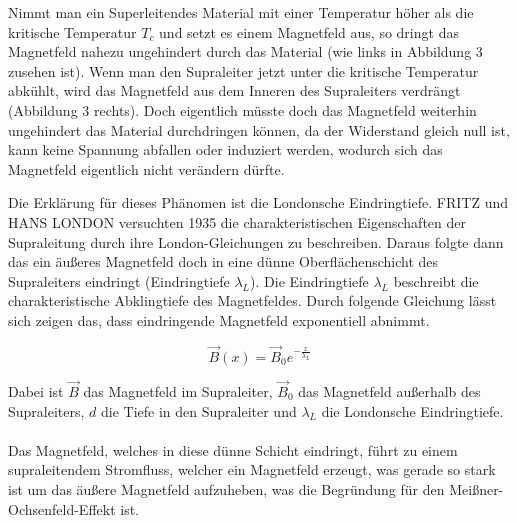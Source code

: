 Nimmt man ein Superleitendes Material mit einer Temperatur höher als die kritische Temperatur $T_c$
und setzt es einem Magnetfeld aus, so dringt das Magnetfeld nahezu ungehindert durch das Material (wie links in Abbildung 3 zusehen ist). 
Wenn man den Supraleiter jetzt unter die kritische Temperatur abkühlt, wird das Magnetfeld aus dem Inneren des Supraleiters verdrängt (Abbildung 3 rechts).
Doch eigentlich müsste doch das Magnetfeld weiterhin ungehindert das Material durchdringen können, da der 
Widerstand gleich null ist, kann keine Spannung abfallen oder induziert werden, wodurch sich das Magnetfeld 
eigentlich nicht verändern dürfte.

Die Erklärung für dieses Phänomen ist die Londonsche Eindringtiefe. FRITZ und HANS LONDON
versuchten 1935 die charakteristischen Eigenschaften der Supraleitung durch ihre London-Gleichungen 
zu beschreiben. Daraus folgte dann das ein äußeres Magnetfeld doch in eine dünne Oberflächenschicht des Supraleiters eindringt (Eindringtiefe $\lambda_L$).
Die Eindringtiefe $\lambda_L$ beschreibt die charakteristische Abklingtiefe des Magnetfeldes.
Durch folgende Gleichung lässt sich zeigen das, dass eindringende Magnetfeld exponentiell abnimmt.

\begin{equation}
    \vec{B}(x) = \vec{B}_0 e^{-\frac{x}{\lambda_L}}
\end{equation}

Dabei ist $\vec{B}$ das Magnetfeld im Supraleiter, $\vec{B}_0$ das Magnetfeld außerhalb des Supraleiters, $d$ die Tiefe in den Supraleiter und $\lambda_L$ die Londonsche Eindringtiefe.
\\
\\
Das Magnetfeld, welches in diese dünne Schicht eindringt, führt zu einem supraleitendem Stromfluss, welcher ein
Magnetfeld erzeugt, was gerade so stark ist um das äußere Magnetfeld aufzuheben, was 
die Begründung für den Meißner-Ochsenfeld-Effekt ist. 

